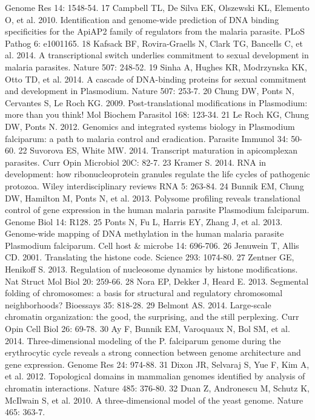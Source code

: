 Genome Res 14: 1548-54.
17  Campbell TL, De Silva EK, Olszewski KL, Elemento O, et al. 2010.
Identification and genome-wide prediction of DNA binding specificities for the
ApiAP2 family of regulators from the malaria parasite. PLoS Pathog 6:
e1001165.
18  Kafsack BF, Rovira-Graells N, Clark TG, Bancells C, et al. 2014. A
transcriptional switch underlies commitment to sexual development in malaria
parasites. Nature 507: 248-52.
19  Sinha A, Hughes KR, Modrzynska KK, Otto TD, et al. 2014. A cascade of
DNA-binding proteins for sexual commitment and development in Plasmodium.
Nature 507: 253-7.
20  Chung DW, Ponts N, Cervantes S, Le Roch KG. 2009. Post-translational
modifications in Plasmodium: more than you think! Mol Biochem Parasitol 168:
123-34.
21  Le Roch KG, Chung DW, Ponts N. 2012. Genomics and integrated systems
biology in Plasmodium falciparum: a path to malaria control and eradication.
Parasite Immunol 34: 50-60.
22  Suvorova ES, White MW. 2014. Transcript maturation in apicomplexan
parasites. Curr Opin Microbiol 20C: 82-7.
23  Kramer S. 2014. RNA in development: how ribonucleoprotein granules
regulate the life cycles of pathogenic protozoa. Wiley interdisciplinary
reviews RNA 5: 263-84.
24  Bunnik EM, Chung DW, Hamilton M, Ponts N, et al. 2013. Polysome profiling
reveals translational control of gene expression in the human malaria parasite
Plasmodium falciparum. Genome Biol 14: R128.
25  Ponts N, Fu L, Harris EY, Zhang J, et al. 2013. Genome-wide mapping of DNA
methylation in the human malaria parasite Plasmodium falciparum. Cell host \&
microbe 14: 696-706.
26  Jenuwein T, Allis CD. 2001. Translating the histone code. Science 293:
1074-80.
27  Zentner GE, Henikoff S. 2013. Regulation of nucleosome dynamics by histone
modifications. Nat Struct Mol Biol 20: 259-66.
28  Nora EP, Dekker J, Heard E. 2013. Segmental folding of chromosomes: a
basis for structural and regulatory chromosomal neighborhoods? Bioessays 35:
818-28.
29  Belmont AS. 2014. Large-scale chromatin organization: the good, the
surprising, and the still perplexing. Curr Opin Cell Biol 26: 69-78.
30  Ay F, Bunnik EM, Varoquaux N, Bol SM, et al. 2014. Three-dimensional
modeling of the P. falciparum genome during the erythrocytic cycle reveals a
strong connection between genome architecture and gene expression. Genome Res
24: 974-88.
31  Dixon JR, Selvaraj S, Yue F, Kim A, et al. 2012. Topological domains in
mammalian genomes identified by analysis of chromatin interactions. Nature
485: 376-80.
32  Duan Z, Andronescu M, Schutz K, McIlwain S, et al. 2010. A
three-dimensional model of the yeast genome. Nature 465: 363-7.
